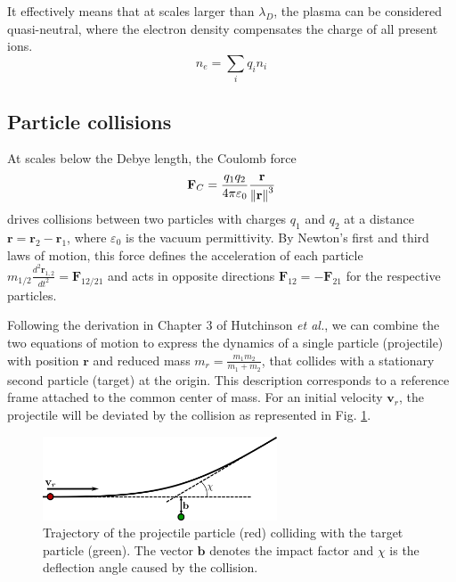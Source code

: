 It effectively means that at scales larger than $\lambda_D$, the plasma can be considered quasi-neutral, where the electron density compensates the charge of all present ions.
\begin{equation}
	\label{eq:1_quasiNeutrality}
	n_e = \sum_{i}q_in_i
\end{equation}



\subsection{Particle collisions}
\label{sec:intro_collisions}

At scales below the Debye length, the Coulomb force
\begin{equation}
	\mathbf{F}_C = \frac{q_1q_2}{4\pi\varepsilon_0}\frac{\mathbf{r}}{\norm{\mathbf{r}}^3}
	\label{eq:1_CoulombForce}
\end{equation}
drives collisions between two particles with charges \( q_1 \) and \( q_2 \) at a distance \( \mathbf{r} = \mathbf{r}_2 - \mathbf{r}_1 \), where \( \varepsilon_0 \) is the vacuum permittivity. By Newton's first and third laws of motion, this force defines the acceleration of each particle \( m_{1/2}\frac{d^2\mathbf{r}_{1,2}}{dt^2} = \mathbf{F}_{12/21} \) and acts in opposite directions \( \mathbf{F}_{12} = -\mathbf{F}_{21} \) for the respective particles.


Following the derivation in Chapter 3 of Hutchinson \emph{et al.}\cite{hutchinson2001introduction}, we can combine the two equations of motion to express the dynamics of a single particle (projectile) with position \( \mathbf{r} \) and reduced mass \( m_r = \frac{m_1m_2}{m_1 + m_2} \), that collides with a stationary second particle (target) at the origin. This description corresponds to a reference frame attached to the common center of mass. For an initial velocity \( \mathbf{v}_r \), the projectile will be deviated by the collision as represented in Fig. \ref{fig:TokamakBasics_collision}.

\begin{figure}[H]
	\centering
	\includegraphics[width=0.62\textwidth]{schemes/collision.png}
	\caption{Trajectory of the projectile particle (red) colliding with the target particle (green). The vector \( \mathbf{b} \) denotes the impact factor and \( \chi \) is the deflection angle caused by the collision.}
	\label{fig:TokamakBasics_collision}
\end{figure}

